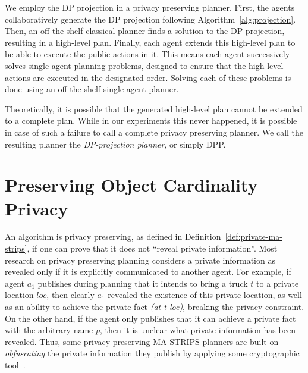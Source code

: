 \documentclass[letterpaper]{article}
\theoremstyle{definition}
\begin{document}
We employ the DP projection in a privacy preserving planner. First, the agents collaboratively generate the DP projection following Algorithm~\ref{alg:projection}. Then, an off-the-shelf classical planner finds a solution to the DP projection, resulting in a high-level plan. Finally, each agent extends this high-level plan to be able to execute the public actions in it. This means each agent successively solves single agent planning problems, designed to ensure that the high level actions are executed in the designated order. Solving each of these problems is done using an off-the-shelf single agent planner.



Theoretically, it is possible that the generated high-level plan cannot be extended to a complete plan. While in our experiments this never happened, it is possible in case of such a failure to call a complete privacy preserving planner. We call the resulting planner the {\em DP-projection planner}, or simply DPP.







\section{Preserving Object Cardinality Privacy }
\label{sec:preserving}

An algorithm is privacy preserving, as defined in Definition~\ref{def:private-ma-strips}, if one can prove that it does not ``reveal private information''. Most research on privacy preserving planning considers a private information as revealed only if it is explicitly communicated to another agent. For example, if agent $a_1$ publishes during planning that it intends to bring a truck $t$ to a private location $loc$, then clearly $a_1$ revealed the existence of this private location, as well as an ability to achieve the private fact {\em (at t loc)}, breaking  the privacy constraint. On the other hand, if the agent only publishes that it can achieve a private fact with the arbitrary name $p$, then it is unclear what private information has been revealed. Thus, some privacy preserving MA-STRIPS planners are built on {\em obfuscating} the private information they publish by applying some cryptographic tool~\cite{luis2014planMerging,Luis2015PMR,Borrajo2015MAPR_CMAP}.
\end{document}
